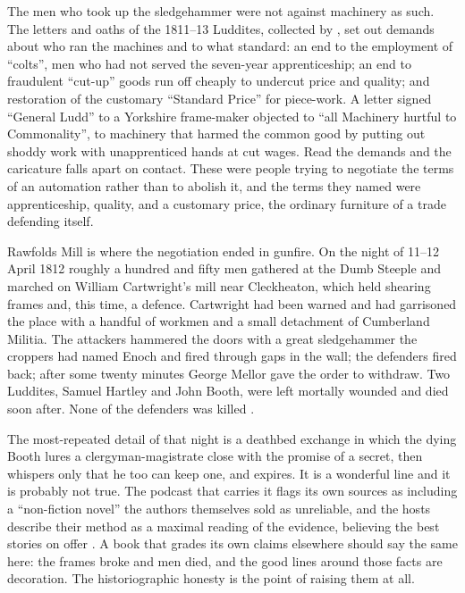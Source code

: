 The men who took up the sledgehammer were not against machinery as such. The letters and oaths of the 1811--13 Luddites, collected by \textcite{Binfield2004}, set out demands about who ran the machines and to what standard: an end to the employment of ``colts'', men who had not served the seven-year apprenticeship; an end to fraudulent ``cut-up'' goods run off cheaply to undercut price and quality; and restoration of the customary ``Standard Price'' for piece-work. A letter signed ``General Ludd'' to a Yorkshire frame-maker objected to ``all Machinery hurtful to Commonality'', to machinery that harmed the common good by putting out shoddy work with unapprenticed hands at cut wages. Read the demands and the caricature falls apart on contact. These were people trying to negotiate the terms of an automation rather than to abolish it, and the terms they named were apprenticeship, quality, and a customary price, the ordinary furniture of a trade defending itself.

Rawfolds Mill is where the negotiation ended in gunfire. On the night of 11--12 April 1812 roughly a hundred and fifty men gathered at the Dumb Steeple and marched on William Cartwright's mill near Cleckheaton, which held shearing frames and, this time, a defence. Cartwright had been warned and had garrisoned the place with a handful of workmen and a small detachment of Cumberland Militia. The attackers hammered the doors with a great sledgehammer the croppers had named Enoch and fired through gaps in the wall; the defenders fired back; after some twenty minutes George Mellor gave the order to withdraw. Two Luddites, Samuel Hartley and John Booth, were left mortally wounded and died soon after. None of the defenders was killed \parencite{Thompson1963}.

The most-repeated detail of that night is a deathbed exchange in which the dying Booth lures a clergyman-magistrate close with the promise of a secret, then whispers only that he too can keep one, and expires. It is a wonderful line and it is probably not true. The podcast that carries it flags its own sources as including a ``non-fiction novel'' the authors themselves sold as unreliable, and the hosts describe their method as a maximal reading of the evidence, believing the best stories on offer \parencite{LynskeyDunt2026Luddites}. A book that grades its own claims elsewhere should say the same here: the frames broke and men died, and the good lines around those facts are decoration. The historiographic honesty is the point of raising them at all.

